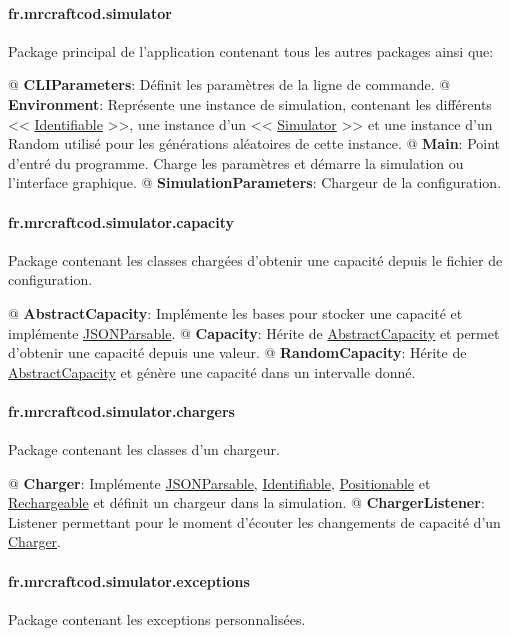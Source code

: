 \documentclass[final]{polytech/polytech}
\newcommand{\class}[1]{\textbf{#1}\label{class:#1}}
\newcommand{\klass}[1]{\hyperref[class:#1]{#1}}
\begin{document}
			\paragraph{fr.mrcraftcod.simulator}
				Package principal de l'application contenant tous les autres packages ainsi que:
				\begin{easylist}
					@ \class{CLIParameters}: Définit les paramètres de la ligne de commande.
					@ \class{Environment}: Représente une instance de simulation, contenant les différents << \klass{Identifiable} >>, une instance d'un << \klass{Simulator} >> et une instance d'un Random utilisé pour les générations aléatoires de cette instance.
					@ \class{Main}: Point d'entré du programme. Charge les paramètres et démarre la simulation ou l'interface graphique.
					@ \class{SimulationParameters}: Chargeur de la configuration.
				\end{easylist}
		
			\paragraph{fr.mrcraftcod.simulator.capacity}
				Package contenant les classes chargées d'obtenir une capacité depuis le fichier de configuration.
				
				\begin{easylist}
					@ \class{AbstractCapacity}: Implémente les bases pour stocker une capacité et implémente \klass{JSONParsable}.
					@ \class{Capacity}: Hérite de \klass{AbstractCapacity} et permet d'obtenir une capacité depuis une valeur.
					@ \class{RandomCapacity}: Hérite de \klass{AbstractCapacity} et génère une capacité dans un intervalle donné.
				\end{easylist}
				
			\paragraph{fr.mrcraftcod.simulator.chargers}
				Package contenant les classes d'un chargeur.
				
				\begin{easylist}
					@ \class{Charger}: Implémente \klass{JSONParsable}, \klass{Identifiable}, \klass{Positionable} et \klass{Rechargeable} et définit un chargeur dans la simulation.
					@ \class{ChargerListener}: Listener permettant pour le moment d'écouter les changements de capacité d'un \klass{Charger}.
				\end{easylist}
				
			\paragraph{fr.mrcraftcod.simulator.exceptions}
				Package contenant les exceptions personnalisées.
				
\end{document}
